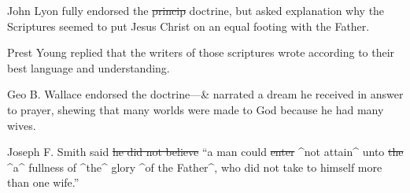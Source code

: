 					John Lyon fully endorsed the \sout{princip} doctrine, but asked explanation why the Scriptures seemed to put Jesus Christ on an equal footing with the Father.
					
					Prest Young replied that the writers of those scriptures wrote according to their best language and understanding.
					
					Geo B. Wallace endorsed the doctrine---\& narrated a dream he received in answer to prayer, shewing that many worlds were made to God because he had many wives.
					
					Joseph F. Smith said \sout{he did not believe} ``a man could \sout{enter} \^{}not attain\^{} unto \sout{the} \^{}a\^{} fullness of \^{}the\^{} glory \^{}of the Father\^{}, who did not take to himself more than one wife.''